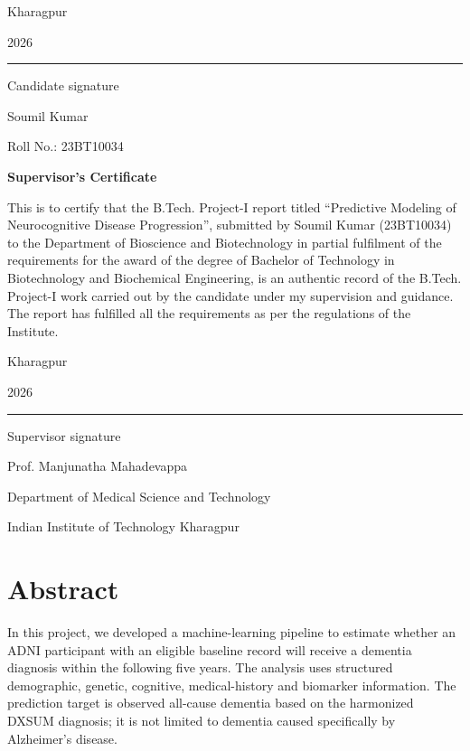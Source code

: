 \documentclass[11pt,a4paper]{article}
\begin{document}
\vspace{24mm}
\noindent\begin{minipage}[t]{.28\linewidth}
\vspace{0pt}
Kharagpur\par 2026
\end{minipage}\hfill
\begin{minipage}[t]{.64\linewidth}
\vspace{0pt}\raggedleft
\rule{58mm}{.4pt}\par
{\small Candidate signature}\par\smallskip
Soumil Kumar\par Roll No.: 23BT10034
\end{minipage}
\clearpage
\thispagestyle{plain}
\vspace*{18mm}
\begin{center}{\Large\bfseries Supervisor's Certificate}\end{center}
\vspace{8mm}
This is to certify that the B.Tech. Project-I report titled ``Predictive Modeling of Neurocognitive Disease Progression'', submitted by Soumil Kumar (23BT10034) to the Department of Bioscience and Biotechnology in partial fulfilment of the requirements for the award of the degree of Bachelor of Technology in Biotechnology and Biochemical Engineering, is an authentic record of the B.Tech. Project-I work carried out by the candidate under my supervision and guidance. The report has fulfilled all the requirements as per the regulations of the Institute.

\vspace{24mm}
\noindent\begin{minipage}[t]{.28\linewidth}
\vspace{0pt}
Kharagpur\par 2026
\end{minipage}\hfill
\begin{minipage}[t]{.64\linewidth}
\vspace{0pt}\raggedleft
\rule{58mm}{.4pt}\par
{\small Supervisor signature}\par\smallskip
Prof. Manjunatha Mahadevappa\par Department of Medical Science and Technology\par Indian Institute of Technology Kharagpur
\end{minipage}
\clearpage
\section*{Abstract}
In this project, we developed a machine-learning pipeline to estimate whether an ADNI participant with an eligible baseline record will receive a dementia diagnosis within the following five years. The analysis uses structured demographic, genetic, cognitive, medical-history and biomarker information. The prediction target is observed all-cause dementia based on the harmonized DXSUM diagnosis; it is not limited to dementia caused specifically by Alzheimer's disease.
\end{document}
